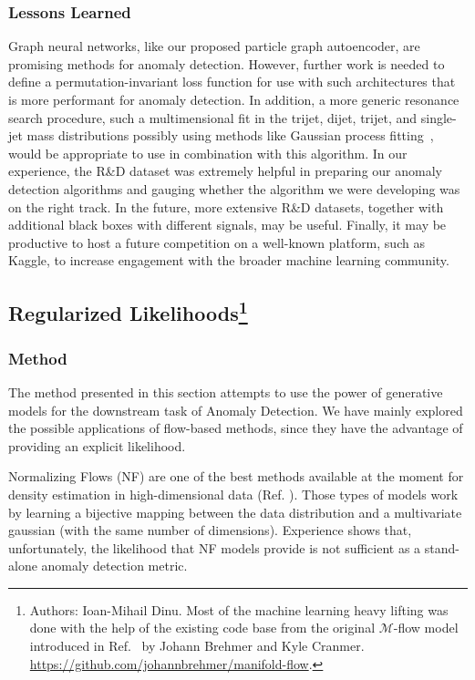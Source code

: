 \documentclass[a4paper,11pt]{article}
\begin{document}
\subsubsection{Lessons Learned}
\label{sec:lessons}

Graph neural networks, like our proposed particle graph autoencoder, are promising methods for anomaly detection.
However, further work is needed to define a permutation-invariant loss function for use with such architectures that is more performant for anomaly detection.
In addition, a more generic resonance search procedure, such a multimensional fit in the trijet, dijet, trijet, and single-jet mass distributions possibly using methods like Gaussian process fitting~\cite{Frate:2017mai}, would be appropriate to use in combination with this algorithm.
In our experience, the R\&D dataset was extremely helpful in preparing our anomaly detection algorithms and gauging whether the algorithm we were developing was on the right track. 
In the future, more extensive R\&D datasets, together with additional black boxes with different signals, may be useful.
Finally, it may be productive to host a future competition on a well-known platform, such as Kaggle, to increase engagement with the broader machine learning community.


 \FloatBarrier

\subsection[Regularized Likelihoods]{Regularized Likelihoods\footnote{Authors: Ioan-Mihail Dinu.  Most of the machine learning heavy lifting was done with the help of the existing code base from the original $\mathcal{M}$-flow model introduced in Ref.~\cite{Brehmer:2020vwc} by Johann Brehmer and Kyle Cranmer. \href{https://github.com/johannbrehmer/manifold-flow}{https://github.com/johannbrehmer/manifold-flow}.}}

\label{sec:regualrizedlikes}

\subsubsection{Method}
\label{sec:method}
The method presented in this section attempts to use the power of generative models for the downstream task of Anomaly Detection. We have mainly explored the possible applications of flow-based methods, since they have the advantage of providing an explicit likelihood.

Normalizing Flows (NF) are one of the best methods available at the moment for density estimation in high-dimensional data (Ref. \cite{pmlr-v37-rezende15}). Those types of models work by learning a bijective mapping between the data distribution and a multivariate gaussian (with the same number of dimensions). Experience shows that, unfortunately, the likelihood that NF models provide is not sufficient as a stand-alone anomaly detection metric. 
\end{document}
